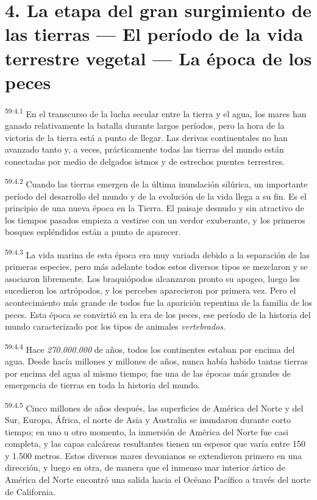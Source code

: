 \section*{4. La etapa del gran surgimiento de las tierras --- El período de la vida terrestre vegetal --- La época de los peces }
\par
\textsuperscript{59:4.1} En el transcurso de la lucha secular entre la tierra y el agua, los mares han ganado relativamente la batalla durante largos períodos, pero la hora de la victoria de la tierra está a punto de llegar. Las derivas continentales no han avanzado tanto y, a veces, prácticamente todas las tierras del mundo están conectadas por medio de delgados istmos y de estrechos puentes terrestres.

\par
\textsuperscript{59:4.2} Cuando las tierras emergen de la última inundación silúrica, un importante período del desarrollo del mundo y de la evolución de la vida llega a su fin. Es el principio de una nueva época en la Tierra. El paisaje desnudo y sin atractivo de los tiempos pasados empieza a vestirse con un verdor exuberante, y los primeros bosques espléndidos están a punto de aparecer.

\par
\textsuperscript{59:4.3} La vida marina de esta época era muy variada debido a la separación de las primeras especies, pero más adelante todos estos diversos tipos se mezclaron y se asociaron libremente. Los braquiópodos alcanzaron pronto su apogeo, luego les sucedieron los artrópodos, y los percebes aparecieron por primera vez. Pero el acontecimiento más grande de todos fue la aparición repentina de la familia de los peces. Esta época se convirtió en la era de los peces, ese período de la historia del mundo caracterizado por los tipos de animales \textit{vertebrados}.

\par
\textsuperscript{59:4.4} Hace \textit{270.000.000} de años, todos los continentes estaban por encima del agua. Desde hacía millones y millones de años, nunca había habido tantas tierras por encima del agua al mismo tiempo; fue una de las épocas más grandes de emergencia de tierras en toda la historia del mundo.

\par
\textsuperscript{59:4.5} Cinco millones de años después, las superficies de América del Norte y del Sur, Europa, África, el norte de Asia y Australia se inundaron durante corto tiempo; en uno u otro momento, la inmersión de América del Norte fue casi completa, y las capas calcáreas resultantes tienen un espesor que varía entre 150 y 1.500 metros. Estos diversos mares devonianos se extendieron primero en una dirección, y luego en otra, de manera que el inmenso mar interior ártico de América del Norte encontró una salida hacia el Océano Pacífico a través del norte de California.

